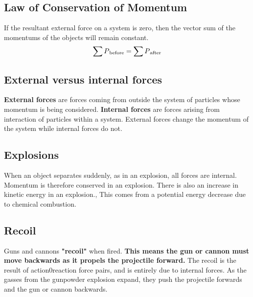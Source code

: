 \subsection{Law of Conservation of Momentum}
If the resultant external force on a system is zero, then the vector sum of the momentums of the objects will remain constant. \[\sum P\textsubscript{before}=\sum P\textsubscript{after}\]

\subsection{External versus internal forces}
\textbf{External forces} are forces coming from outside the system of particles whose momentum is being considered. \textbf{Internal forces} are forces arising from interaction of particles within a system. External forces change the momentum of the system while internal forces do not.

\subsection{Explosions}
When an object separates suddenly, as in an explosion, all forces are internal. Momentum is therefore conserved in an explosion. There is also an increase in kinetic energy in an explosion., This comes from a potential energy decrease due to chemical combustion.

\subsection{Recoil}
Guns and cannons \textbf{"recoil"} when fired. \textbf{This means the gun or cannon must move backwards as it propels the projectile forward.} The recoil is the result of action0reaction force pairs, and is entirely due to internal forces. As the gasses from the gunpowder explosion expand, they push the projectile forwards and the gun or cannon backwards. 